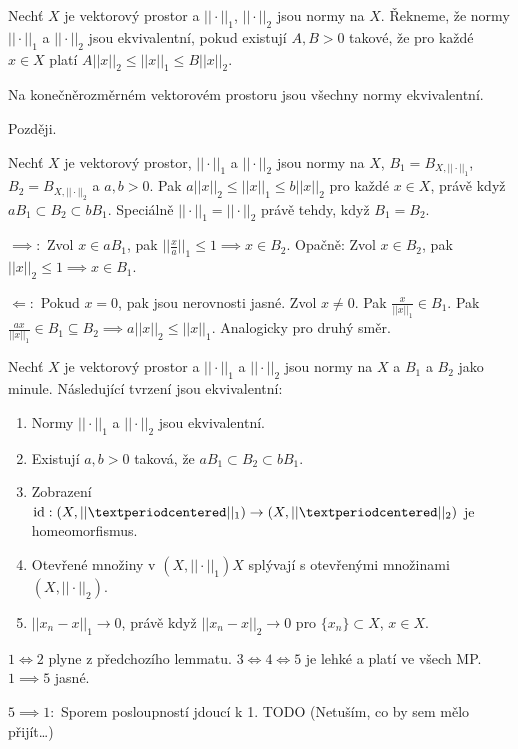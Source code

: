 \documentclass[12pt]{article}					%
\begin{document}
\begin{definice}
	Nechť $X$ je vektorový prostor a $||·||_1$, $||·||_2$ jsou normy na $X$. Řekneme, že normy $||·||_1$ a $||·||_2$ jsou ekvivalentní, pokud existují $A, B > 0$ takové, že pro každé $x \in X$ platí $A ||x||_2 ≤ ||x||_1 ≤ B||x||_2$.
\end{definice}

\begin{veta}
	Na konečněrozměrném vektorovém prostoru jsou všechny normy ekvivalentní.

	\begin{dukazin}
		Později.
	\end{dukazin}
\end{veta}

\begin{lemma}
	Nechť $X$ je vektorový prostor, $||·||_1$ a $||·||_2$ jsou normy na $X$, $B_1 = B_{X, ||·||_1}$, $B_2 = B_{X, ||·||_2}$ a $a, b > 0$. Pak $a||x||_2 ≤ ||x||_1 ≤ b||x||_2$ pro každé $x \in X$, právě když $a B_1 \subset B_2 \subset b B_1$. Speciálně $||·||_1 = ||·||_2$ právě tehdy, když $B_1 = B_2$.

	\begin{dukazin}
		$\implies:$ Zvol $x \in a B_1$, pak $||\frac{x}{a}||_1 ≤ 1 \implies x \in B_2$. Opačně: Zvol $x \in B_2$, pak $||x||_2 ≤ 1 \implies x \in B_1$.

		$\Leftarrow:$ Pokud $x = 0$, pak jsou nerovnosti jasné. Zvol $x≠0$. Pak $\frac{x}{||x||_1} \in B_1$. Pak $\frac{ax}{||x||_1} \in B_1 \subseteq B_2 \implies a||x||_2 ≤ ||x||_1$. Analogicky pro druhý směr.  
	\end{dukazin}
\end{lemma}

\begin{tvrzeni}
	Nechť $X$ je vektorový prostor a $||·||_1$ a $||·||_2$ jsou normy na $X$ a $B_1$ a $B_2$ jako minule. Následující tvrzení jsou ekvivalentní:
	\begin{enumerate}
		\item Normy $||·||_1$ a $||·||_2$ jsou ekvivalentní.
		\item Existují $a, b > 0$ taková, že $aB_1 \subset B_2 \subset bB_1$.
		\item Zobrazení $\id: (X, ||·||_1) \rightarrow \left(X, ||·||_2\right)$ je homeomorfismus.
		\item Otevřené množiny v $\left(X, ||·||_1\right)X$ splývají s otevřenými množinami $\left(X, ||·||_2\right)$.
		\item $||x_n - x||_1 \rightarrow 0$, právě když $||x_n - x||_2 \rightarrow 0$ pro $\{x_n\} \subset X$, $x \in X$.
	\end{enumerate}

	\begin{dukazin}
		$1 \Leftrightarrow 2$ plyne z předchozího lemmatu. $3 \Leftrightarrow 4 \Leftrightarrow 5$ je lehké a platí ve všech MP. $1 \implies 5$ jasné.

		$5 \implies 1:$ Sporem posloupností jdoucí k 1. TODO (Netuším, co by sem mělo přijít…)
	\end{dukazin}
\end{tvrzeni}
\end{document}
